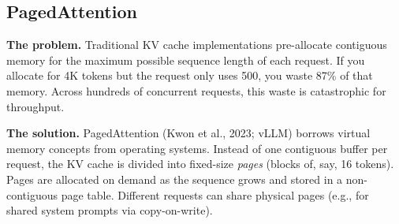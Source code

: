 \subsection{PagedAttention}

\textbf{The problem.} Traditional KV cache implementations pre-allocate contiguous memory for the maximum possible sequence length of each request. If you allocate for 4K tokens but the request only uses 500, you waste 87\% of that memory. Across hundreds of concurrent requests, this waste is catastrophic for throughput.

\textbf{The solution.} PagedAttention (Kwon et al., 2023; vLLM) borrows virtual memory concepts from operating systems. Instead of one contiguous buffer per request, the KV cache is divided into fixed-size \textit{pages} (blocks of, say, 16 tokens). Pages are allocated on demand as the sequence grows and stored in a non-contiguous page table. Different requests can share physical pages (e.g., for shared system prompts via copy-on-write).

